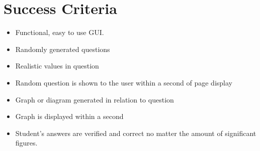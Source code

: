 \section{Success Criteria}
\begin{itemize}
	\item Functional, easy to use GUI.
	\item Randomly generated questions
	\item Realistic values in question
	\item Random question is shown to the user within a second of page display
	\item Graph or diagram generated in relation to question
	\item Graph is displayed within a second
	\item Student's answers are verified and correct no matter the amount of significant figures.
\end{itemize}